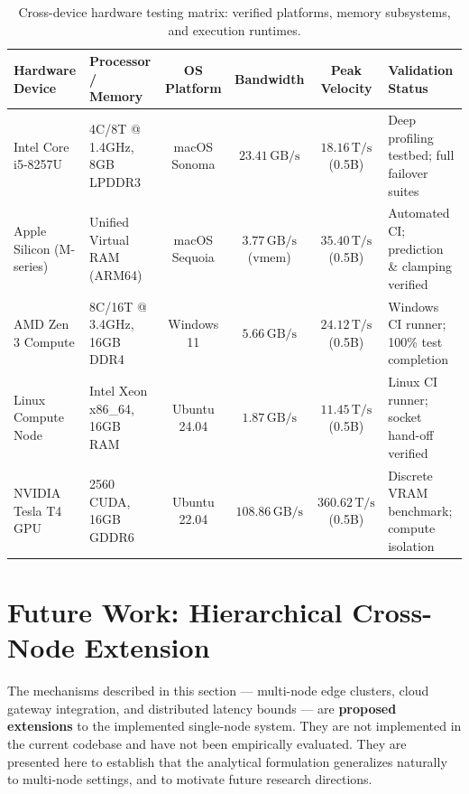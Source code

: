 \documentclass[11pt,a4paper]{article}
\newcommand{\Ts}{\,\mathrm{T/s}}
\newcommand{\GBs}{\,\mathrm{GB/s}}
\begin{document}
\begin{table}[h]
\centering
\caption{Cross-device hardware testing matrix: verified platforms, memory subsystems, and execution runtimes.}\label{tab:device_matrix}
\footnotesize
\begin{tabularx}{\linewidth}{@{}p{3.0cm}p{2.8cm}cccX@{}}
\toprule
\textbf{Hardware Device} & \textbf{Processor / Memory} & \textbf{OS Platform} & \textbf{Bandwidth} & \textbf{Peak Velocity} & \textbf{Validation Status} \\
\midrule
Intel Core i5-8257U & 4C/8T @ 1.4GHz, 8GB LPDDR3 & macOS Sonoma & $23.41\GBs$ & $18.16\Ts$ (0.5B) & Deep profiling testbed; full failover suites \\
Apple Silicon (M-series) & Unified Virtual RAM (ARM64) & macOS Sequoia & $3.77\GBs$ (vmem) & $35.40\Ts$ (0.5B) & Automated CI; prediction \& clamping verified \\
AMD Zen 3 Compute & 8C/16T @ 3.4GHz, 16GB DDR4 & Windows 11 & $5.66\GBs$ & $24.12\Ts$ (0.5B) & Windows CI runner; 100\% test completion \\
Linux Compute Node & Intel Xeon x86\_64, 16GB RAM & Ubuntu 24.04 & $1.87\GBs$ & $11.45\Ts$ (0.5B) & Linux CI runner; socket hand-off verified \\
NVIDIA Tesla T4 GPU & 2560 CUDA, 16GB GDDR6 & Ubuntu 22.04 & $\mathbf{108.86\GBs}$ & $\mathbf{360.62\Ts}$ (0.5B) & Discrete VRAM benchmark; compute isolation \\
\bottomrule
\end{tabularx}
\end{table}

\section{Future Work: Hierarchical Cross-Node Extension}\label{sec:discussion}

\begin{tcolorbox}[warnbox,title={Scope Clarification}]
The mechanisms described in this section --- multi-node edge clusters, cloud gateway integration, and distributed latency bounds --- are \textbf{proposed extensions} to the implemented single-node system. They are not implemented in the current codebase and have not been empirically evaluated. They are presented here to establish that the analytical formulation generalizes naturally to multi-node settings, and to motivate future research directions.
\end{tcolorbox}
\end{document}
